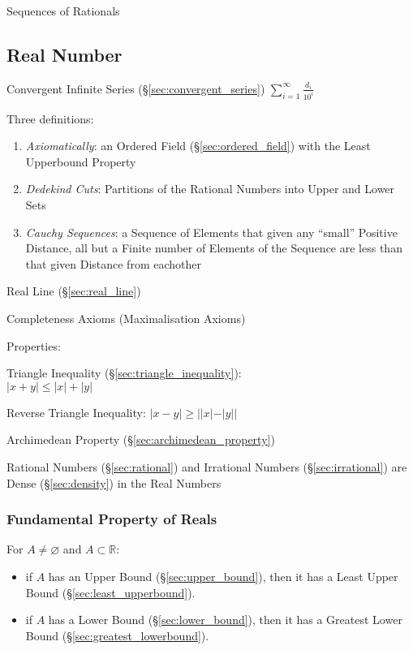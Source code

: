 Sequences of Rationals




\subsection{Real Number}\label{sec:real_number}

Convergent Infinite Series (\S\ref{sec:convergent_series}) $\sum_{i =
  1}^{\infty} \frac{d_i}{10^i}$

Three definitions:
\begin{enumerate}
  \item \emph{Axiomatically}: an Ordered Field
    (\S\ref{sec:ordered_field}) with the Least Upperbound Property
  \item \emph{Dedekind Cuts}: Partitions of the Rational Numbers into
    Upper and Lower Sets
  \item \emph{Cauchy Sequences}: a Sequence of Elements that given any
    ``small'' Positive Distance, all but a Finite number of Elements
    of the Sequence are less than that given Distance from eachother
\end{enumerate}

Real Line (\S\ref{sec:real_line})

Completeness Axioms (Maximalisation Axioms)

Properties:

Triangle Inequality (\S\ref{sec:triangle_inequality}):\\
$|x + y| \leq |x| + |y|$

Reverse Triangle Inequality: $|x - y| \geq ||x| - |y||$

Archimedean Property (\S\ref{sec:archimedean_property})

Rational Numbers (\S\ref{sec:rational}) and Irrational Numbers
(\S\ref{sec:irrational}) are Dense (\S\ref{sec:density}) in the Real
Numbers



\subsubsection{Fundamental Property of Reals}
\label{sec:fundamental_property}

For $A \neq \varnothing$ and $A \subset \mathbb{R}$:
\begin{itemize}
  \item if $A$ has an Upper Bound (\S\ref{sec:upper_bound}), then it
    has a Least Upper Bound (\S\ref{sec:least_upperbound}).
  \item if $A$ has a Lower Bound (\S\ref{sec:lower_bound}), then it
    has a Greatest Lower Bound (\S\ref{sec:greatest_lowerbound}).
\end{itemize}

